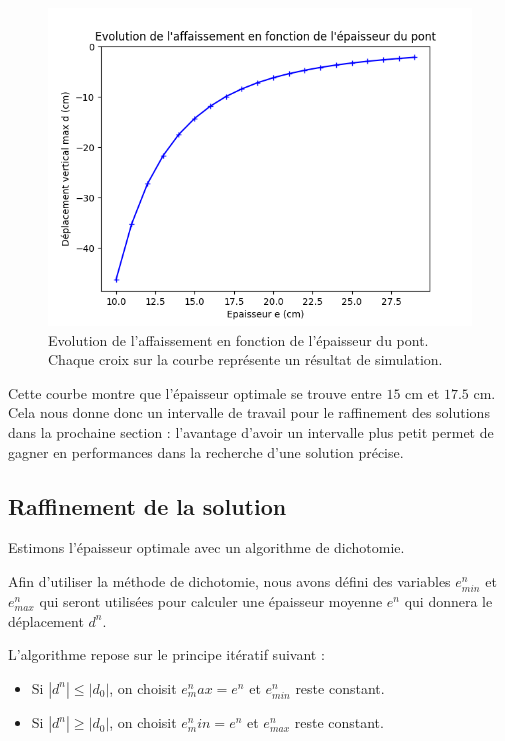 \documentclass{article}
\begin{document}
    \begin{figure}[H]        
    \begin{center}
	
        \includegraphics[width=12cm]{imgs/ed.png}
        \caption{Evolution de l'affaissement en fonction de l'épaisseur du pont. Chaque croix sur la courbe représente un résultat de simulation.}
        \label{fig:graph}
    
	\end{center}
    \end{figure}
    
    Cette courbe montre que l'épaisseur optimale se trouve entre $15$ cm et $17.5$ cm. 
    Cela nous donne donc un intervalle de travail pour le raffinement des solutions dans la prochaine section :
    l'avantage d'avoir un intervalle plus petit permet de gagner en performances dans la recherche d'une solution précise.

    \subsection{Raffinement de la solution}

    \begin{problem}{6}
        Estimons l'épaisseur optimale avec un algorithme de dichotomie.
    \end{problem}
    
    Afin d'utiliser la méthode de dichotomie, 
    nous avons défini des variables $e^n_{min}$ et $e^n_{max}$  qui seront utilisées pour calculer une épaisseur moyenne $e^n$ 	
    qui donnera le déplacement $d^n$. 
    
    L'algorithme repose sur le principe itératif suivant :    
    \begin{itemize}
    \item Si $|d^n| \le |d_0|$, on choisit $e^n_max = e^n$ et $e^n_{min}$ reste constant.
    \item Si $|d^n| \ge |d_0|$, on choisit $e^n_min = e^n$ et $e^n_{max}$ reste constant.
    \end{itemize}
   
\end{document}
